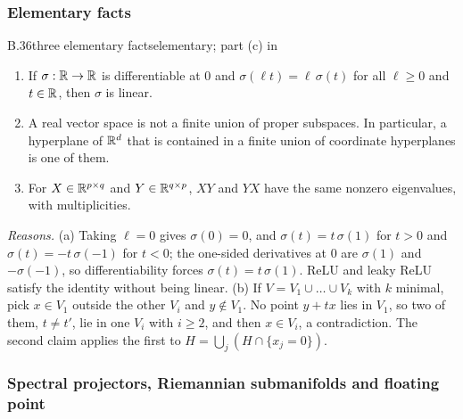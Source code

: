 \subsubsection{Elementary facts}

\begin{auxresult}{B.36}{three elementary facts}{elementary; part (c) in \citealp[Ch.~1]{xhorn2013matrix}}
\begin{enumerate}[label=(\alph*)]
  \item If $\sigma:\mathbb{R}\to\mathbb{R}$ is differentiable at $0$ and $\sigma(\ell t)=\ell\,\sigma(t)$ for all $\ell\ge0$ and
    $t\in\mathbb{R}$, then $\sigma$ is linear.
  \item A real vector space is not a finite union of proper subspaces. In particular, a hyperplane of $\mathbb{R}^d$ that is
    contained in a finite union of coordinate hyperplanes is one of them.
  \item For $X\in\mathbb{R}^{p\times q}$ and $Y\in\mathbb{R}^{q\times p}$, $XY$ and $YX$ have the same nonzero eigenvalues, with
    multiplicities.
\end{enumerate}
\end{auxresult}
\noindent\emph{Reasons.} (a) Taking $\ell=0$ gives $\sigma(0)=0$, and $\sigma(t)=t\,\sigma(1)$ for $t>0$ and
$\sigma(t)=-t\,\sigma(-1)$ for $t<0$; the one-sided derivatives at $0$ are $\sigma(1)$ and $-\sigma(-1)$, so
differentiability forces $\sigma(t)=t\,\sigma(1)$. ReLU and leaky ReLU satisfy the identity without being linear. (b)
If $V=V_1\cup\dots\cup V_k$ with $k$ minimal, pick $x\in V_1$ outside the other $V_i$ and $y\notin V_1$. No point $y+tx$
lies in $V_1$, so two of them, $t\ne t'$, lie in one $V_i$ with $i\ge2$, and then $x\in V_i$, a contradiction. The second
claim applies the first to $H=\bigcup_j(H\cap\{x_j=0\})$.

\subsubsection{Spectral projectors, Riemannian submanifolds and floating point}

